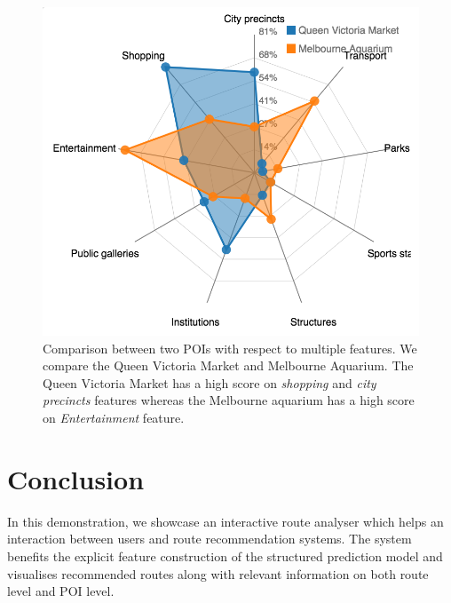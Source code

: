 \documentclass[sigconf]{acmart}
\begin{document}
\begin{figure}[t!]
\includegraphics[width=0.8\linewidth]{figure/sample_radar.png}
\caption{Comparison between two POIs with respect to multiple features. We compare the Queen Victoria Market and Melbourne Aquarium. The Queen Victoria Market has a high score on \textit{shopping} and \textit{city precincts} features whereas the Melbourne aquarium has a high score on \textit{Entertainment} feature.}
\label{fig:radar}
\end{figure}


\section{Conclusion}
In this demonstration, we showcase an interactive route analyser which helps an interaction between users and route recommendation systems. The system benefits the explicit feature construction of the structured prediction model and visualises recommended routes along with relevant information on both route level and POI level.


 
\end{document}
